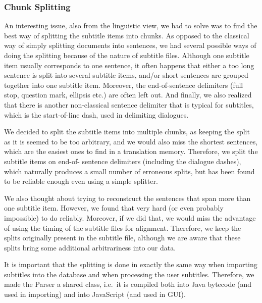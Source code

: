 \subsubsection{Chunk Splitting}

An interesting issue, also from the linguistic view, we had to solve was to find the best way of splitting the subtitle items into chunks. As opposed to the classical way of simply splitting documents into sentences, we had several possible ways of doing the splitting because of the nature of subtitle files.
Although one subtitle item usually corresponds to one sentence, it often happens that either a too long sentence is split into several subtitle items, and/or short sentences are grouped together into one subtitle item. Moreover, the end-of-sentence delimiters (full stop, question mark, ellipsis etc.) are often left out.
And finally, we also realized that there is another non-classical sentence delimiter that is typical for subtitles, which is the start-of-line dash, used in delimiting dialogues.

We decided to split the subtitle items into multiple chunks,
as keeping the split as it is seemed to be too arbitrary, and we would 
also miss the shortest sentences, which are the easiest ones to find in a 
translation memory. Therefore, we split the subtitle items on end-of-
sentence delimiters (including the dialogue dashes), which naturally 
produces a small number of erroneous splits, but has been found to be 
reliable enough even using a simple splitter.

We also thought about trying to reconstruct the sentences that span more than one subtitle item. However, we found that very hard (or even probably impossible) to do reliably. Moreover, if we did that, we would miss the advantage of using the timing of the subtitle files for alignment. Therefore, we keep the splits originally present in the subtitle file, although we are aware that these splits bring some additional arbitrariness into our data.

It is important that the splitting is done in exactly the same way when importing subtitles into the database and when processing the user subtitles. Therefore, we made the Parser a shared class, i.e.\ it is compiled both into Java bytecode (and used in importing) and into JavaScript (and used in GUI).

